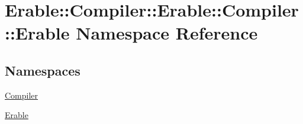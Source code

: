 \hypertarget{namespace_erable_1_1_compiler_1_1_erable_1_1_compiler_1_1_erable}{}\section{Erable\+::Compiler\+::Erable\+::Compiler\+::Erable Namespace Reference}
\label{namespace_erable_1_1_compiler_1_1_erable_1_1_compiler_1_1_erable}
\subsection*{Namespaces}
\begin{DoxyCompactItemize}
\item 
 \mbox{\hyperlink{namespace_erable_1_1_compiler_1_1_erable_1_1_compiler_1_1_erable_1_1_compiler}{Compiler}}
\item 
 \mbox{\hyperlink{namespace_erable_1_1_compiler_1_1_erable_1_1_compiler_1_1_erable_1_1_erable}{Erable}}
\end{DoxyCompactItemize}
